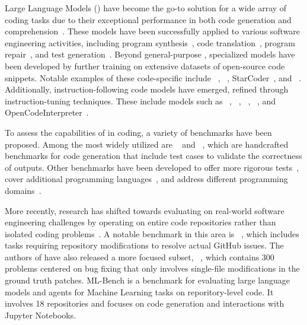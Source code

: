 Large Language Models () have become the go-to solution for a wide array of coding tasks due to their exceptional performance in both code generation and comprehension~\cite{codex}. These models have been successfully applied to various software engineering activities, including program synthesis~\cite{patton2024programming, codex, li2022competition, iyer2018mapping}, code translation~\cite{pan2024lost, roziere2020unsupervised, roziere2021leveraging}, program repair~\cite{xia2023repairstudy, chatrepair, monperrus2018living, bouzenia2024repairagent}, and test generation~\cite{titanfuzz, fuzz4all, deng2023fuzzgpt, lemieux2023codamosa, kang2023testing}. Beyond general-purpose , specialized models have been developed by further training on extensive datasets of open-source code snippets. Notable examples of these code-specific  include \codex~\cite{codex}, \codellama~\cite{codellama}, StarCoder~\cite{starcoder,starcodertwo}, and \deepseek~\cite{deepseek}. Additionally, instruction-following code models have emerged, refined through instruction-tuning techniques. These include models such as \codellamainstruct~\cite{codellama}, \deepseekinstruct~\cite{deepseek}, \wizardcoder~\cite{wizardcoder}, \magicoder~\cite{magicoder}, and OpenCodeInterpreter~\cite{zheng2024opencodeinterpreter}.

To assess the capabilities of  in coding, a variety of benchmarks have been proposed. Among the most widely utilized are \humaneval~\cite{codex} and \mbpp~\cite{austin2021program}, which are handcrafted benchmarks for code generation that include test cases to validate the correctness of \llm outputs. Other benchmarks have been developed to offer more rigorous tests~\cite{evalplus}, cover additional programming languages~\cite{zheng2023codegeex,cassano2023multipl}, and address different programming domains~\cite{livecodebench, hendrycksapps2021, codecontest, ds1000, arcade}.

More recently, research has shifted towards evaluating  on real-world software engineering challenges by operating on entire code repositories rather than isolated coding problems~\cite{swebench, zhang2023repocoder, liu2023repobench}. A notable benchmark in this area is \swebench~\cite{swebench}, which includes tasks requiring repository modifications to resolve actual GitHub issues. The authors of \swebench have also released a more focused subset, \swebenchlite~\cite{swebenchlite}, which contains 300 problems centered on bug fixing that only involves single-file modifications in the ground truth patches. ML-Bench \cite{liu2023mlbench} is a benchmark for evaluating large language models and agents for Machine Learning tasks on reporitory-level code. It involves 18 repositories and focuses on code generation and interactions with Jupyter Notebooks.

